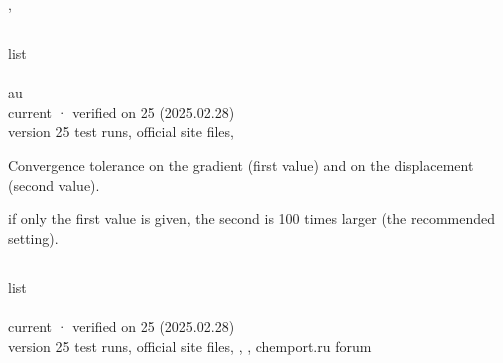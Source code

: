 \documentclass[letterpaper,10pt,english,openany,oneside]{sphinxmanual}
\begin{document}
\sphinxAtStartPar
{} {\hyperref[\detokenize{reference/optimize:optimize-follow}]{}}, {\hyperref[\detokenize{reference/Energy:energy-h}]{}}


\subsection{}
\label{\detokenize{reference/optimize:tolerance}}\label{\detokenize{reference/optimize:optimize-tolerance}}
\ignorespaces 
\sphinxAtStartPar
{} list\\
 \\
 au\\
 current · verified on 25 (2025.02.28)\\
 version 25 test runs, official site files, 

\sphinxAtStartPar
Convergence tolerance on the gradient (first value) and on the displacement (second value).

\sphinxAtStartPar
{} if only the first value is given, the second is 100 times larger (the recommended setting).

\sphinxAtStartPar
{} {\hyperref[\detokenize{reference/grid:grid-accuracy}]{}}


\subsection{}
\label{\detokenize{reference/optimize:trust}}\label{\detokenize{reference/optimize:optimize-trust}}
\ignorespaces 
\sphinxAtStartPar
{} list\\
 \\
 current · verified on 25 (2025.02.28)\\
 version 25 test runs, official site files, , , chemport.ru forum
\end{document}
